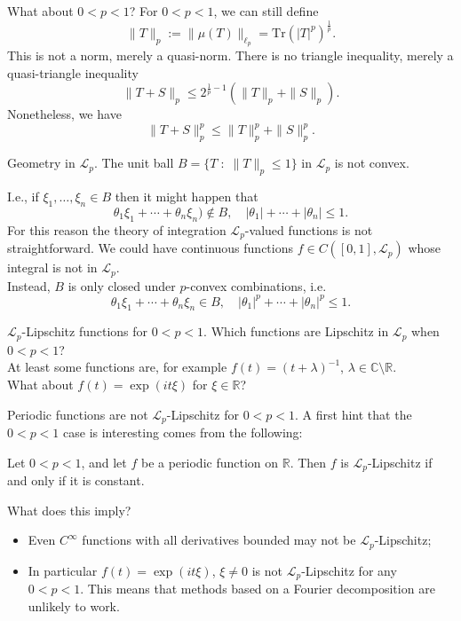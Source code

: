 \documentclass{beamer}
\numberwithin{equation}{section}
\theoremstyle{plain}
\theoremstyle{plain}
\theoremstyle{definition}
\theoremstyle{plain}
\theoremstyle{plain}
\theoremstyle{definition}
\newcommand{\Rl}{\mathbb{R}}
\newcommand{\Cplx}{\mathbb{C}}
\newcommand{\Lc}{\mathcal{L}}
\newcommand{\Tr}{\mathrm{Tr}}
\begin{document}
\begin{frame}{What about $0 < p < 1$?}
    For $0 < p < 1$, we can still define
    $$
        \|T\|_p := \|\mu(T)\|_{\ell_p} = \Tr(|T|^p)^{\frac1p}.
    $$
    This is not a norm, merely a quasi-norm. There is no triangle inequality, merely a quasi-triangle inequality
    $$
        \|T+S\|_p \leq 2^{\frac1p-1}(\|T\|_p+\|S\|_p).
    $$
    \pause
    Nonetheless, we have
    \[
        \|T+S\|_p^p \leq \|T\|_p^p+\|S\|_p^p.
    \]
\end{frame}


\begin{frame}{Geometry in $\Lc_p.$}
    The unit ball $B = \{T\;:\; \|T\|_p\leq 1\}$ in $\Lc_p$ is not convex.

    I.e., if $\xi_1,\ldots,\xi_n\in B$ then it might happen that
    \[
        \theta_1\xi_1+\cdots+\theta_n\xi_n)\notin B,\quad |\theta_1|+\cdots+|\theta_n|\leq 1.
    \]
    For this reason the theory of integration $\Lc_p$-valued functions is not straightforward. We could have continuous functions $f \in C([0,1],\Lc_p)$
    whose integral is not in $\Lc_p.$\\
    \pause
    Instead, $B$ is only closed under $p$-convex combinations, i.e.
    \[
        \theta_1\xi_1+\cdots+\theta_n \xi_n \in B,\quad |\theta_1|^p+\cdots+|\theta_n|^p \leq 1.
    \]
\end{frame}


\begin{frame}{$\Lc_p$-Lipschitz functions for $0 < p < 1.$}
    Which functions are Lipschitz in $\Lc_p$ when $0 < p < 1$? \\
    \pause
    At least some functions are, for example $f(t) = (t+\lambda)^{-1}$, $\lambda \in \Cplx\setminus \Rl.$\\
    \pause
    What about $f(t) = \exp(it\xi)$ for $\xi\in \Rl$?
\end{frame} 

\begin{frame}{Periodic functions are not $\Lc_p$-Lipschitz for $0 < p < 1$.}
    A first hint that the $0 < p < 1$ case is interesting comes from the following:
    \begin{lemma}
        Let $0 < p < 1$, and let $f$ be a periodic function on $\Rl$. Then $f$ is $\Lc_p$-Lipschitz
        if and only if it is constant.
    \end{lemma}
    What does this imply?\pause
    \begin{itemize}
        \item{} Even $C^\infty$ functions with all derivatives bounded may not be $\Lc_p$-Lipschitz;\\
        \item{} In particular $f(t) = \exp(it\xi)$, $\xi\neq 0$ is not $\Lc_p$-Lipschitz for any $0 < p < 1.$ This means that methods based on a Fourier decomposition
        are unlikely to work.
    \end{itemize}
\end{frame}
\end{document}
